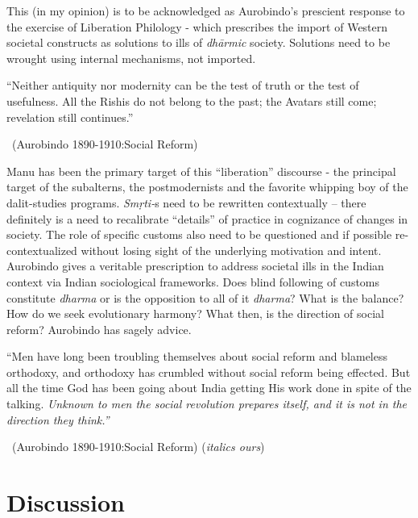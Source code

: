 This (in my opinion) is to be acknowledged as Aurobindo's prescient response to the exercise of Liberation Philology - which prescribes the import of Western societal constructs as solutions to ills of \textit{dhārmic} society. Solutions need to be wrought using internal mechanisms, not imported.

\begin{myquote}
“Neither antiquity nor modernity can be the test of truth or the test of usefulness. All the Rishis do not belong to the past; the Avatars still come; revelation still continues.” 

\vskip -5pt

~\hfill (Aurobindo 1890-1910:Social Reform)
\end{myquote}

\newpage

Manu has been the primary target of this “liberation” discourse - the principal target of the subalterns, the postmodernists and the favorite whipping boy of the dalit-studies programs. \textit{Smṛti-}s need to be rewritten contextually – there definitely is a need to recalibrate “details” of practice in cognizance of changes in society. The role of specific customs also need to be questioned and if possible re-contextualized without losing sight of the underlying motivation and intent. Aurobindo gives a veritable prescription to address societal ills in the Indian context via Indian sociological frameworks. Does blind following of customs constitute \textit{dharma} or is the opposition to all of it \textit{dharma}? What is the balance? How do we seek evolutionary harmony? What then, is the direction of social reform? Aurobindo has sagely advice.

\begin{myquote}
“Men have long been troubling themselves about social reform and blameless orthodoxy, and orthodoxy has crumbled without social reform being effected. But all the time God has been going about India getting His work done in spite of the talking. \textit{Unknown to men the social revolution prepares itself, and it is not in the direction they think.”} 

~\hfill (Aurobindo 1890-1910:Social Reform) (\textit{italics ours})
\end{myquote}

\section*{Discussion}

